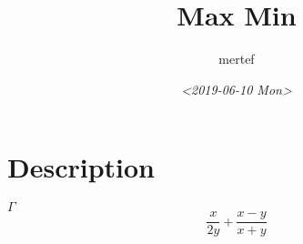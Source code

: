 \documentclass[11pt]{article}
\author{mertef}
\date{\textit{<2019-06-10 Mon>}}
\title{Max Min}
\begin{document}
\maketitle
\tableofcontents

\section{Description}
\label{sec-1}
$\Gamma$
$$\frac{x}{2y} +\frac{x-y}{x+y} $$
\end{document}
